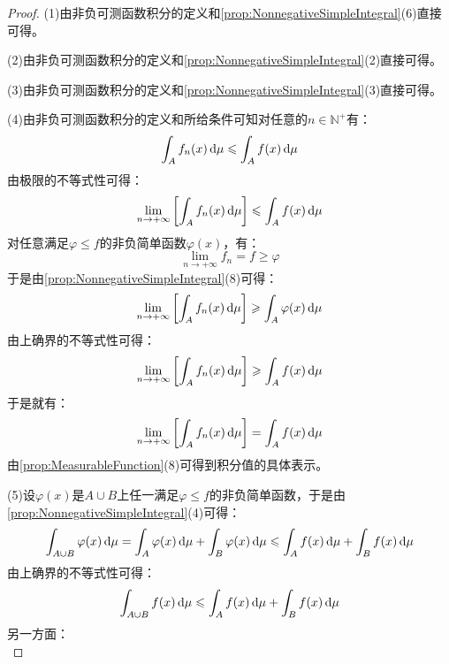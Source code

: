 \begin{proof}
	(1)由非负可测函数积分的定义和\cref{prop:NonnegativeSimpleIntegral}(6)直接可得。\par
	(2)由非负可测函数积分的定义和\cref{prop:NonnegativeSimpleIntegral}(2)直接可得。\par
	(3)由非负可测函数积分的定义和\cref{prop:NonnegativeSimpleIntegral}(3)直接可得。\par
	(4)由非负可测函数积分的定义和所给条件可知对任意的$n\in\mathbb{N}^+$有：
	\begin{equation*}
		\int_{A}^{}f_n(x)\mathop{}\!\mathrm{d}\mu\leqslant\int_{A}^{}f(x)\mathop{}\!\mathrm{d}\mu
	\end{equation*}
	由极限的不等式性可得：
	\begin{equation*}
		\lim_{n\to+\infty}\left[\int_{A}^{}f_n(x)\mathop{}\!\mathrm{d}\mu\right]\leqslant\int_{A}^{}f(x)\mathop{}\!\mathrm{d}\mu
	\end{equation*}
	对任意满足$\varphi\leqslant f$的非负简单函数$\varphi(x)$，有：
	\begin{equation*}
		\lim_{n\to+\infty}f_n=f\geqslant\varphi
	\end{equation*}
	于是由\cref{prop:NonnegativeSimpleIntegral}(8)可得：
	\begin{equation*}
		\lim_{n\to+\infty}\left[\int_{A}^{}f_n(x)\mathop{}\!\mathrm{d}\mu\right]\geqslant\int_{A}^{}\varphi(x)\mathop{}\!\mathrm{d}\mu
	\end{equation*}
	由上确界的不等式性可得：
	\begin{equation*}
		\lim_{n\to+\infty}\left[\int_{A}^{}f_n(x)\mathop{}\!\mathrm{d}\mu\right]\geqslant\int_{A}^{}f(x)\mathop{}\!\mathrm{d}\mu
	\end{equation*}
	于是就有：
	\begin{equation*}
		\lim_{n\to+\infty}\left[\int_{A}^{}f_n(x)\mathop{}\!\mathrm{d}\mu\right]=\int_{A}^{}f(x)\mathop{}\!\mathrm{d}\mu
	\end{equation*}
	由\cref{prop:MeasurableFunction}(8)可得到积分值的具体表示。\par
	(5)设$\varphi(x)$是$A\cup B$上任一满足$\varphi\leqslant f$的非负简单函数，于是由\cref{prop:NonnegativeSimpleIntegral}(4)可得：
	\begin{equation*}
		\int_{A\cup B}\varphi(x)\mathop{}\!\mathrm{d}\mu=\int_{A}\varphi(x)\mathop{}\!\mathrm{d}\mu+\int_{B}\varphi(x)\mathop{}\!\mathrm{d}\mu\leqslant\int_{A}f(x)\mathop{}\!\mathrm{d}\mu+\int_{B}f(x)\mathop{}\!\mathrm{d}\mu
	\end{equation*}
	由上确界的不等式性可得：
	\begin{equation*}
		\int_{A\cup B}f(x)\mathop{}\!\mathrm{d}\mu\leqslant\int_{A}f(x)\mathop{}\!\mathrm{d}\mu+\int_{B}f(x)\mathop{}\!\mathrm{d}\mu
	\end{equation*}
	另一方面：
	\begin{equation*}

\end{equation*}
\end{proof}
